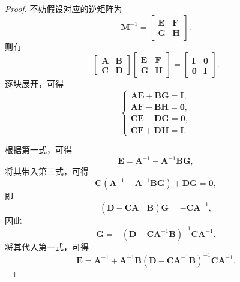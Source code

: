 \begin{proof}
    不妨假设对应的逆矩阵为
    \[
        \mathbf{M}^{-1} = \begin{bmatrix}
            \mathbf{E} & \mathbf{F} \\
            \mathbf{G} & \mathbf{H}
        \end{bmatrix}.
    \]
    则有
    \[
        \begin{bmatrix}
            \mathbf{A} & \mathbf{B} \\
            \mathbf{C} & \mathbf{D}
        \end{bmatrix}
        \begin{bmatrix}
            \mathbf{E} & \mathbf{F} \\
            \mathbf{G} & \mathbf{H}
        \end{bmatrix}
        = \begin{bmatrix}
            \mathbf{I} & \mathbf{0} \\
            \mathbf{0} & \mathbf{I}
        \end{bmatrix}.
    \]
    逐块展开，可得
    \[
        \begin{cases}
            \mathbf{A}\mathbf{E} + \mathbf{B}\mathbf{G} = \mathbf{I}, \\
            \mathbf{A}\mathbf{F} + \mathbf{B}\mathbf{H} = \mathbf{0}, \\
            \mathbf{C}\mathbf{E} + \mathbf{D}\mathbf{G} = \mathbf{0}, \\
            \mathbf{C}\mathbf{F} + \mathbf{D}\mathbf{H} = \mathbf{I}.
        \end{cases}
    \]

    根据第一式，可得
    \[
        \mathbf{E} = \mathbf{A}^{-1} - \mathbf{A}^{-1}\mathbf{B}\mathbf{G},
    \]
    将其带入第三式，可得
    \[
        \mathbf{C}(\mathbf{A}^{-1} - \mathbf{A}^{-1}\mathbf{B}\mathbf{G}) + \mathbf{D}\mathbf{G} = \mathbf{0},
    \]
    即
    \[
        (\mathbf{D} - \mathbf{C}\mathbf{A}^{-1}\mathbf{B})\mathbf{G} = -\mathbf{C}\mathbf{A}^{-1},
    \]
    因此
    \begin{equation}
        \mathbf{G} = - (\mathbf{D} - \mathbf{C}\mathbf{A}^{-1}\mathbf{B})^{-1}\mathbf{C}\mathbf{A}^{-1}.
    \end{equation}
    将其代入第一式，可得
    \begin{equation}
        \mathbf{E} = \mathbf{A}^{-1} + \mathbf{A}^{-1}\mathbf{B}(\mathbf{D} - \mathbf{C}\mathbf{A}^{-1}\mathbf{B})^{-1}\mathbf{C}\mathbf{A}^{-1}.
    \end{equation}


\end{proof}
